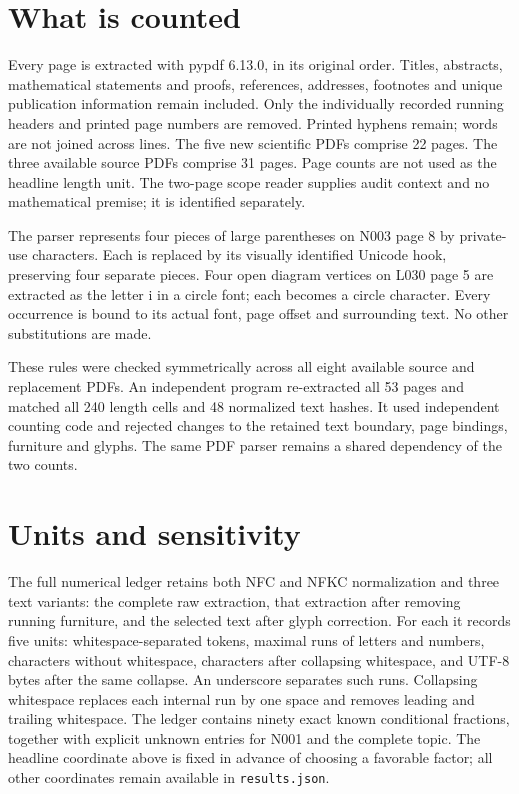 \documentclass[11pt,a4paper]{article}
\begin{document}
\newpage
\section*{What is counted}
Every page is extracted with pypdf 6.13.0, in its original order.
Titles, abstracts, mathematical statements and proofs, references,
addresses, footnotes and unique publication information remain included.
Only the individually recorded running headers and printed page numbers
are removed. Printed hyphens remain; words are not joined across lines.
The five new scientific PDFs comprise 22 pages. The three available
source PDFs comprise 31 pages. Page counts are not used as the headline
length unit. The two-page scope reader supplies audit context and no
mathematical premise; it is identified separately.

The parser represents four pieces of large parentheses on N003 page 8 by
private-use characters. Each is replaced by its visually identified
Unicode hook, preserving four separate pieces. Four open diagram vertices
on L030 page 5 are extracted as the letter i in a circle font; each becomes
a circle character. Every occurrence is bound to its actual font,
page offset and surrounding text. No other substitutions are made.

These rules were checked symmetrically across all eight available source
and replacement PDFs. An independent program re-extracted all 53 pages and
matched all 240 length cells and 48 normalized text hashes. It used independent counting code and rejected changes to the retained text boundary,
page bindings, furniture and glyphs. The same PDF parser remains a shared
dependency of the two counts.

\section*{Units and sensitivity}
The full numerical ledger retains both NFC and NFKC normalization and
three text variants: the complete raw extraction, that extraction after
removing running furniture, and the selected text after glyph correction.
For each it records five units: whitespace-separated tokens, maximal runs
of letters and numbers, characters without whitespace, characters after
collapsing whitespace, and UTF-8 bytes after the same collapse. An underscore
separates such runs. Collapsing whitespace replaces each
internal run by one space and removes leading and trailing whitespace.
The ledger contains ninety exact known conditional fractions, together
with explicit unknown entries for N001 and the complete topic. The
headline coordinate above is fixed in advance of choosing a favorable
factor; all other coordinates remain available in \texttt{results.json}.
\end{document}
